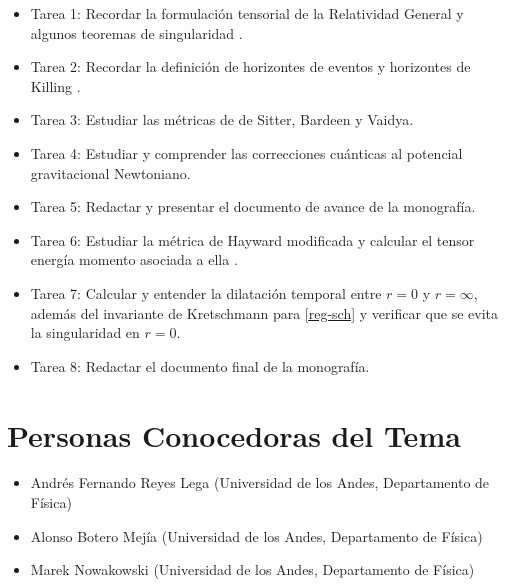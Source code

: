 \documentclass[prb,aps,preprintnumbers,amsmath,amssymb]{article}
\begin{document}
\begin{itemize}
	\item Tarea 1: Recordar la formulaci\'on tensorial de la Relatividad General y algunos teoremas de singularidad \cite{inverno}.
	\item Tarea 2: Recordar la definici\'on de horizontes de eventos y horizontes de Killing \cite{hawking}.
	\item Tarea 3: Estudiar las m\'etricas de de Sitter, Bardeen y Vaidya.
	\item Tarea 4: Estudiar y comprender las correcciones cu\'anticas al potencial gravitacional Newtoniano.
	\item Tarea 5: Redactar y presentar el documento de avance de la monograf\'ia.
	\item Tarea 6: Estudiar la m\'etrica de Hayward modificada y calcular el tensor energ\'ia momento asociada a ella .
	\item Tarea 7: Calcular y entender la dilataci\'on temporal entre $r = 0$ y $r = \infty$, adem\'as del invariante de Kretschmann para \eqref{reg-sch} y verificar que se evita la singularidad en $r = 0$.
	\item Tarea 8: Redactar el documento final de la monograf\'ia.
\end{itemize}

\section{Personas Conocedoras del Tema}


\begin{itemize}
	\item Andr\'es Fernando Reyes Lega (Universidad de los Andes, Departamento de F\'isica)
	\item Alonso Botero Mej\'ia (Universidad de los Andes, Departamento de F\'isica)
	\item Marek Nowakowski (Universidad de los Andes, Departamento de F\'isica)
\end{itemize}
\end{document}
